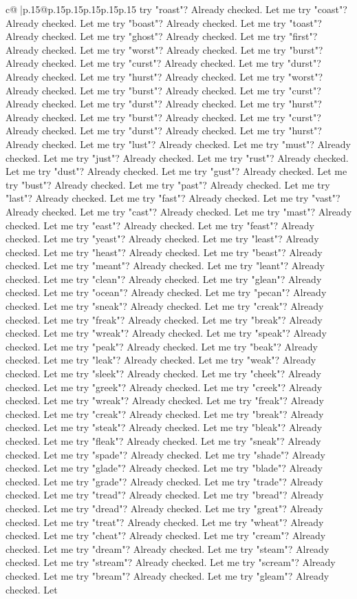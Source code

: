 \documentclass{article}
\begin{document}
{\begin{supertabular}{c@{$\;$}|p{.15\linewidth}@{}p{.15\linewidth}p{.15\linewidth}p{.15\linewidth}p{.15\linewidth}p{.15\linewidth}}
{{{try "roast"? Already checked. Let me try "coast"? Already checked. Let me try "boast"? Already checked. Let me try "toast"? Already checked. Let me try "ghost"? Already checked. Let me try "first"? Already checked. Let me try "worst"? Already checked. Let me try "burst"? Already checked. Let me try "curst"? Already checked. Let me try "durst"? Already checked. Let me try "hurst"? Already checked. Let me try "worst"? Already checked. Let me try "burst"? Already checked. Let me try "curst"? Already checked. Let me try "durst"? Already checked. Let me try "hurst"? Already checked. Let me try "burst"? Already checked. Let me try "curst"? Already checked. Let me try "durst"? Already checked. Let me try "hurst"? Already checked. Let me try "lust"? Already checked. Let me try "must"? Already checked. Let me try "just"? Already checked. Let me try "rust"? Already checked. Let me try "dust"? Already checked. Let me try "gust"? Already checked. Let me try "bust"? Already checked. Let me try "past"? Already checked. Let me try "last"? Already checked. Let me try "fast"? Already checked. Let me try "vast"? Already checked. Let me try "cast"? Already checked. Let me try "mast"? Already checked. Let me try "east"? Already checked. Let me try "feast"? Already checked. Let me try "yeast"? Already checked. Let me try "least"? Already checked. Let me try "heast"? Already checked. Let me try "beast"? Already checked. Let me try "meant"? Already checked. Let me try "leant"? Already checked. Let me try "clean"? Already checked. Let me try "glean"? Already checked. Let me try "ocean"? Already checked. Let me try "pecan"? Already checked. Let me try "sneak"? Already checked. Let me try "creak"? Already checked. Let me try "freak"? Already checked. Let me try "break"? Already checked. Let me try "wreak"? Already checked. Let me try "speak"? Already checked. Let me try "peak"? Already checked. Let me try "beak"? Already checked. Let me try "leak"? Already checked. Let me try "weak"? Already checked. Let me try "sleek"? Already checked. Let me try "cheek"? Already checked. Let me try "greek"? Already checked. Let me try "creek"? Already checked. Let me try "wreak"? Already checked. Let me try "freak"? Already checked. Let me try "creak"? Already checked. Let me try "break"? Already checked. Let me try "steak"? Already checked. Let me try "bleak"? Already checked. Let me try "fleak"? Already checked. Let me try "sneak"? Already checked. Let me try "spade"? Already checked. Let me try "shade"? Already checked. Let me try "glade"? Already checked. Let me try "blade"? Already checked. Let me try "grade"? Already checked. Let me try "trade"? Already checked. Let me try "tread"? Already checked. Let me try "bread"? Already checked. Let me try "dread"? Already checked. Let me try "great"? Already checked. Let me try "treat"? Already checked. Let me try "wheat"? Already checked. Let me try "cheat"? Already checked. Let me try "cream"? Already checked. Let me try "dream"? Already checked. Let me try "steam"? Already checked. Let me try "stream"? Already checked. Let me try "scream"? Already checked. Let me try "bream"? Already checked. Let me try "gleam"? Already checked. Let }}}
\end{supertabular}}
\end{document}

